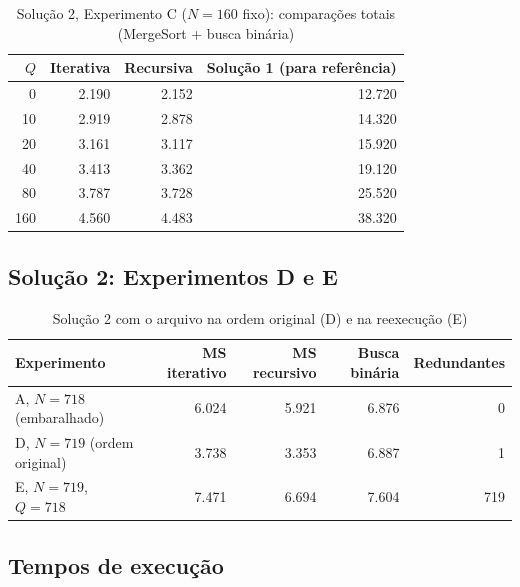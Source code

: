 \documentclass[11pt,a4paper]{article}
\begin{document}
\begin{table}[H]
\centering
\caption{Solução 2, Experimento C ($N=160$ fixo): comparações totais (MergeSort + busca binária)}
\begin{tabular}{rrrr}
\toprule
$Q$ & Iterativa & Recursiva & Solução 1 (para referência) \\
\midrule
0 & 2.190 & 2.152 & 12.720 \\
10 & 2.919 & 2.878 & 14.320 \\
20 & 3.161 & 3.117 & 15.920 \\
40 & 3.413 & 3.362 & 19.120 \\
80 & 3.787 & 3.728 & 25.520 \\
160 & 4.560 & 4.483 & 38.320 \\
\bottomrule
\end{tabular}
\end{table}

\subsection{Solução 2: Experimentos D e E}

\begin{table}[H]
\centering
\caption{Solução 2 com o arquivo na ordem original (D) e na reexecução (E)}
\begin{tabular}{lrrrr}
\toprule
Experimento & MS iterativo & MS recursivo & Busca binária & Redundantes \\
\midrule
A, $N=718$ (embaralhado) & 6.024 & 5.921 & 6.876 & 0 \\
D, $N=719$ (ordem original) & 3.738 & 3.353 & 6.887 & 1 \\
E, $N=719$, $Q=718$ & 7.471 & 6.694 & 7.604 & 719 \\
\bottomrule
\end{tabular}
\end{table}

\subsection{Tempos de execução}
\end{document}

